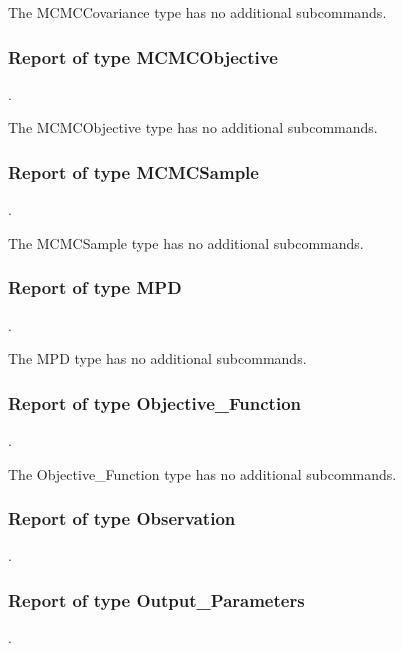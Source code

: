 The MCMCCovariance type has no additional subcommands.
\subsubsection{Report of type MCMCObjective}
.
\label{syntax:Report-MCMCObjective}

The MCMCObjective type has no additional subcommands.
\subsubsection{Report of type MCMCSample}
.
\label{syntax:Report-MCMCSample}

The MCMCSample type has no additional subcommands.
\subsubsection{Report of type MPD}
.
\label{syntax:Report-MPD}

The MPD type has no additional subcommands.
\subsubsection{Report of type Objective\_Function}
.
\label{syntax:Report-ObjectiveFunction}

The Objective\_Function type has no additional subcommands.
\subsubsection{Report of type Observation}
.
\label{syntax:Report-Observation}




\subsubsection{Report of type Output\_Parameters}
.
\label{syntax:Report-OutputParameters}

